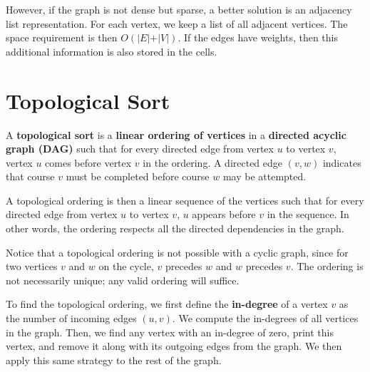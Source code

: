 However, if the graph is not dense but sparse, a better solution is an adjacency list representation. For each vertex, we keep a list of all adjacent vertices. The space requirement is then \(O(\vert E \vert + \vert V \vert)\). If the edges have weights, then this additional information is also stored in the cells. 

\section{Topological Sort}
A \textbf{topological sort} is a \textbf{linear ordering of vertices} in a \textbf{directed acyclic graph (DAG)} such that for every directed edge from vertex \(u\) to vertex \(v\), vertex \(u\) comes before vertex \(v\) in the ordering. A directed edge \((v, w)\) indicates that course \(v\) must be completed before course \(w\) may be attempted.

A topological ordering is then a linear sequence of the vertices such that for every directed edge from vertex \(u\) to vertex \(v\), \(u\) appears before \(v\) in the sequence. In other words, the ordering respects all the directed dependencies in the graph.

Notice that a topological ordering is not possible with a cyclic graph, since for two vertices \(v\) and \(w\) on the cycle, \(v\) precedes \(w\) and \(w\) precedes \(v\). The ordering is not necessarily unique; any valid ordering will suffice.

To find the topological ordering, we first define the \textbf{in-degree} of a vertex \(v\) as the number of incoming edges \((u, v)\). We compute the in-degrees of all vertices in the graph. Then, we find any vertex with an in-degree of zero, print this vertex, and remove it along with its outgoing edges from the graph. We then apply this same strategy to the rest of the graph. 

